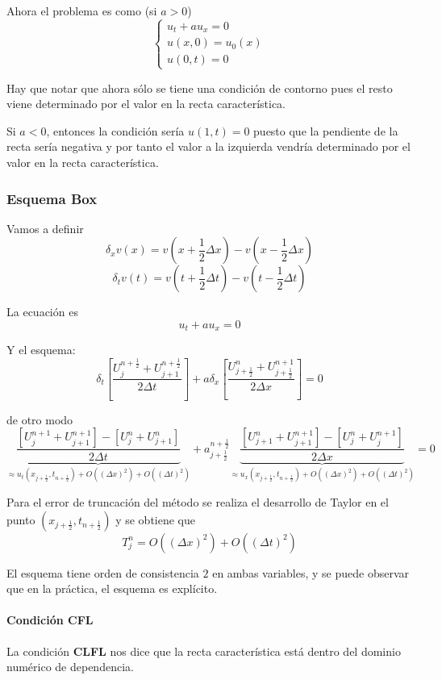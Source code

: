Ahora el problema es como (si $a > 0$)
\begin{equation*}
	\left\{
	\begin{array}{l}
		u_t+au_x = 0\\
		u(x,0) = u_0(x)\\
		u(0,t) = 0
	\end{array}
	\right.
\end{equation*}

Hay que notar que ahora sólo se tiene una condición de contorno pues el resto viene determinado por el valor en la recta característica.

Si $a<0$, entonces la condición sería $u(1,t) = 0$ puesto que la pendiente de la recta sería negativa y por tanto el valor a la izquierda vendría determinado por el valor en la recta característica.

\subsubsection{Esquema Box}
Vamos a definir
$$\delta_x v(x) = v(x+\frac{1}{2}\Delta x) - v(x-\frac{1}{2}\Delta x)$$
$$\delta_t v(t) = v(t+\frac{1}{2}\Delta t) - v(t-\frac{1}{2}\Delta t)$$

La ecuación es 
$$u_t+au_x= 0$$

Y el esquema:
$$\delta_t\left[\frac{U_j^{n+\frac{1}{2}}+U_{j+1}^{n+\frac{1}{2}}}{2\Delta t}\right] + a\delta_x\left[\frac{U_{j+\frac{1}{2}}^{n}+U_{j+\frac{1}{2}}^{n+1}}{2\Delta x}\right] = 0$$

de otro modo
$$\underbrace{\frac{\left[U_j^{n+1}+U_{j+1}^{n+1}\right]-\left[U_j^{n}+U_{j+1}^{n}\right]}{2\Delta t}}_{\approx u_t(x_{j+\frac{1}{2}}, t_{n+\frac{1}{2}})+O((\Delta x)^2)+O((\Delta t)^2)}+a_{j+\frac{1}{2}}^{n+\frac{1}{2}}\underbrace{\frac{\left[U_{j+1}^{n}+U_{j+1}^{n+1}\right]-\left[U_j^{n}+U_{j}^{n+1}\right]}{2\Delta x}}_{\approx u_x(x_{j+\frac{1}{2}}, t_{n+\frac{1}{2}})+O((\Delta x)^2)+O((\Delta t)^2)} = 0$$

Para el error de truncación del método se realiza el desarrollo de Taylor en el punto $(x_{j+\frac{1}{2}}, t_{n+\frac{1}{2}})$ y se obtiene que
$$T_j^n = O((\Delta x)^2)+O((\Delta t)^2)$$

El esquema tiene orden de consistencia $2$ en ambas variables, y se puede observar que en la práctica, el esquema es explícito.

\paragraph{Condición CFL}
La condición \textbf{CLFL} nos dice que la recta característica está dentro del dominio numérico de dependencia.

